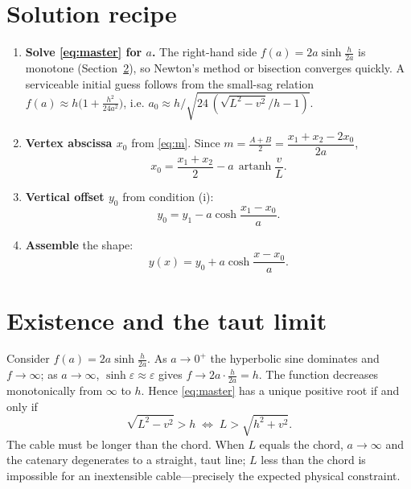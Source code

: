 \documentclass[11pt]{article}
\theoremstyle{remark}
\newcommand{\artanh}{\operatorname{artanh}}
\begin{document}
\section{Solution recipe}
\begin{enumerate}[label=\textbf{\arabic*.},leftmargin=*]
  \item \textbf{Solve \eqref{eq:master} for $a$.} The right-hand side
        $f(a)=2a\sinh\frac{h}{2a}$ is monotone (Section~\ref{sec:existence}), so Newton's
        method or bisection converges quickly. A serviceable initial guess follows from the
        small-sag relation $f(a)\approx h\big(1+\tfrac{h^2}{24a^2}\big)$, i.e.
        $a_0\approx h\big/\!\sqrt{24\,(\sqrt{L^2-v^2}/h-1)}$.
  \item \textbf{Vertex abscissa $x_0$} from \eqref{eq:m}. Since
        $m=\tfrac{A+B}{2}=\dfrac{x_1+x_2-2x_0}{2a}$,
        \begin{equation}
          x_0 = \frac{x_1+x_2}{2} - a\,\artanh\frac{v}{L}.
        \end{equation}
  \item \textbf{Vertical offset $y_0$} from condition (i):
        \begin{equation}
          y_0 = y_1 - a\cosh\frac{x_1-x_0}{a}.
        \end{equation}
  \item \textbf{Assemble} the shape:
        \begin{equation}
          y(x) = y_0 + a\cosh\frac{x-x_0}{a}.
        \end{equation}
\end{enumerate}

\section{Existence and the taut limit}
\label{sec:existence}
Consider $f(a)=2a\sinh\frac{h}{2a}$. As $a\to0^+$ the hyperbolic sine dominates and
$f\to\infty$; as $a\to\infty$, $\sinh\varepsilon\approx\varepsilon$ gives
$f\to 2a\cdot\frac{h}{2a}=h$. The function decreases monotonically from $\infty$ to $h$.
Hence \eqref{eq:master} has a unique positive root if and only if
\begin{equation}
  \sqrt{L^2-v^2}>h
  \;\Longleftrightarrow\;
  L>\sqrt{h^2+v^2}.
\end{equation}
The cable must be longer than the chord. When $L$ equals the chord, $a\to\infty$ and the
catenary degenerates to a straight, taut line; $L$ less than the chord is impossible for an
inextensible cable---precisely the expected physical constraint.
\end{document}
